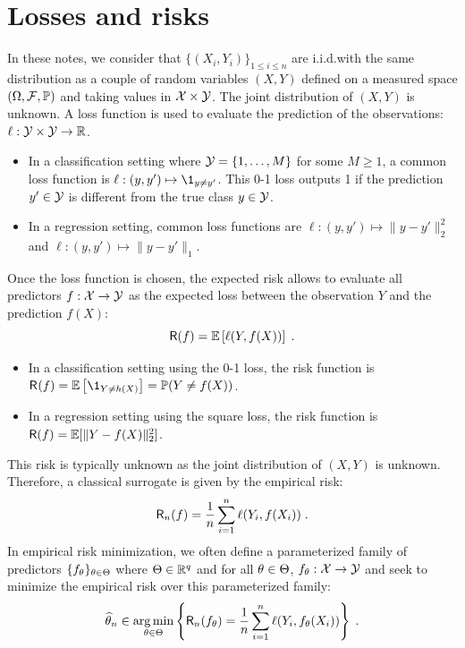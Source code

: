 \section{Losses and risks}
In these notes, we consider that $\{(X_i,Y_i)\}_{1\leqslant i \leqslant n}$ are i.i.d.with the same distribution as a couple of random variables $(X,Y)$ defined on  a measured space $(\Omega,\mathcal{F},\mathbb{P})$ and taking values in $\mathcal{X}\times\mathcal{Y}$. The joint distribution of $(X,Y)$ is unknown. A loss function is used to evaluate the prediction of the observations: $\ell: \mathcal{Y}\times \mathcal{Y} \to \mathbb{R}$.
\begin{itemize}
\item In a classification setting where $\mathcal{Y} = \{1,\ldots,M\}$ for some $M\geqslant 1$, a common loss function is $\ell : (y,y')\mapsto \1_{y\neq y'}$. This 0-1 loss outputs 1 if the prediction $y'\in\mathcal{Y}$ is different from the true class $y\in\mathcal{Y}$.
\item In a regression setting,  common loss functions are $\ell : (y,y')\mapsto \|y-y'\|_2^2$ and $\ell : (y,y')\mapsto \|y-y'\|_1$.
\end{itemize}
Once the loss function is chosen, the expected risk allows to evaluate all predictors $f: \mathcal{X}\to \mathcal{Y}$ as the expected loss between the observation $Y$ and the prediction $f(X)$:
$$
\mathsf{R}(f) = \mathbb{E}\left[\ell(Y,f(X))\right]\;.
$$
\begin{itemize}
\item In a classification setting using the 0-1 loss, the risk function is $\mathsf{R}_{}(f) = \bE\left[\1_{Y\neq h(X)}\right]= \bP(Y\neq f(X))$.
\item In a regression setting using the square loss,   the risk function is $\mathsf{R}(f) = \mathbb{E}[\|Y-f(X)\|^2_2]$.
\end{itemize}
This risk is typically unknown as the joint distribution of $(X,Y)$ is unknown. Therefore, a classical surrogate is given by the empirical risk:
$$
\mathsf{R}_n(f) = \frac{1}{n}\sum_{i=1}^n\ell(Y_i,f(X_i))\;.
$$
In empirical risk minimization, we often define a parameterized family of predictors $\{f_\theta\}_{\theta\in \Theta}$ where $\Theta\in \mathbb{R}^q$ and for all $\theta\in\Theta$, $f_\theta: \mathcal{X}\to \mathcal{Y}$ and seek to minimize the empirical risk over this parameterized family:
$$
\widehat\param_n \in\argmin_{\param\in\paramset} \left\{\mathsf{R}_n(f_\param) = \frac{1}{n}\sum_{i=1}^n\ell(Y_i,f_\param(X_i)) \right\}\eqsp.
$$

